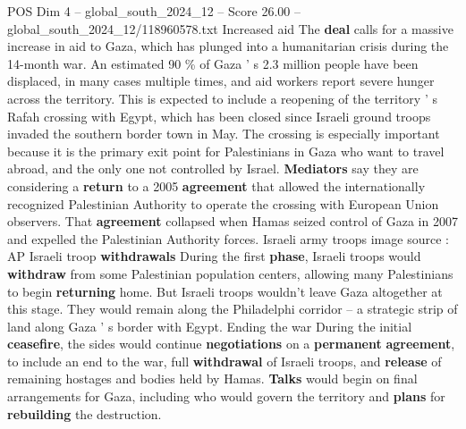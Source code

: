 \begin{textsample}{POS Dim 4 – global\_south\_2024\_12 – Score 26.00 – global\_south\_2024\_12/118960578.txt}
Increased aid The \textbf{deal} calls for a massive increase in aid to Gaza, which has plunged into a humanitarian crisis during the 14-month war.
An estimated 90 \% of Gaza ' s 2.3 million people have been displaced, in many cases multiple times, and aid workers report severe hunger across the territory.
This is expected to include a reopening of the territory ' s Rafah crossing with Egypt, which has been closed since Israeli ground troops invaded the southern border town in May.
The crossing is especially important because it is the primary exit point for Palestinians in Gaza who want to travel abroad, and the only one not controlled by Israel. \textbf{Mediators} say they are considering a \textbf{return} to a 2005 \textbf{agreement} that allowed the internationally recognized Palestinian Authority to operate the crossing with European Union observers.
That \textbf{agreement} collapsed when Hamas seized control of Gaza in 2007 and expelled the Palestinian Authority forces.
Israeli army troops image source : AP Israeli troop \textbf{withdrawals} During the first \textbf{phase}, Israeli troops would \textbf{withdraw} from some Palestinian population centers, allowing many Palestinians to begin \textbf{returning} home.
But Israeli troops wouldn't leave Gaza altogether at this stage.
They would remain along the Philadelphi corridor -- a strategic strip of land along Gaza ' s border with Egypt.
Ending the war During the initial \textbf{ceasefire}, the sides would continue \textbf{negotiations} on a \textbf{permanent} \textbf{agreement}, to include an end to the war, full \textbf{withdrawal} of Israeli troops, and \textbf{release} of remaining hostages and bodies held by Hamas. \textbf{Talks} would begin on final arrangements for Gaza, including who would govern the territory and \textbf{plans} for \textbf{rebuilding} the destruction.

\end{textsample}

